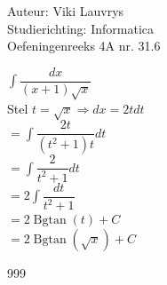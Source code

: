 \documentclass[a4paper]{article}
\begin{document}
  
\noindent \large Auteur: Viki	Lauvrys \\
\noindent \large Studierichting: Informatica\\
\noindent \large Oefeningenreeks 4A nr. 31.6\\

\medskip

\normalsize

$ \displaystyle\int \dfrac{dx}{(x+1) \sqrt{x}} $ \\

Stel $ t = \sqrt{x} \Rightarrow dx = 2t dt $ \\

$ = \displaystyle\int \dfrac{2t}{(t^2 +1) t} dt $ \\

$ = \displaystyle\int \dfrac{2}{t^2 +1} dt $ \\

$ = 2 \displaystyle\int \dfrac{dt}{t^2 +1} $ \\

$ = 2 \operatorname{Bgtan} ( t ) + C $ \\

$ = 2 \operatorname{Bgtan} \left( \sqrt{x} \right) + C $ \\

\begin{thebibliography}{999}
\end{thebibliography}
\end{document}

